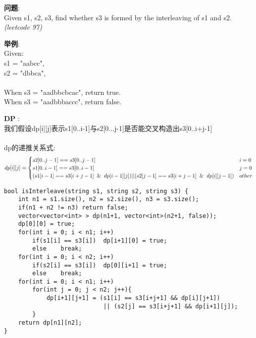     
\begin{description}
    \item{\textbf{问题}}:\\
Given s1, s2, s3, find whether s3 is formed by the interleaving of s1 and s2.\textit{(leetcode 97)}

    \item{\textbf{举例}}:\\
Given:\\
s1 = "aabcc",\\
s2 = "dbbca",\\
\\
When s3 = "aadbbcbcac", return true.\\
When s3 = "aadbbbaccc", return false.\\
    \item{\textbf{DP}} : 
	\\我们假设dp[i][j]表示s1[0..i-1]与s2[0...j-1]是否能交叉构造出s3[0..i+j-1]\\
	\\dp的递推关系式:
$$
dp[i][j] =
\begin{cases} 
s2[0..j-1] == s3[0..j-1] & i = 0 \\
s1[0..i-1] == s3[0..i-1] & j = 0 \\
(s1[i-1] == s3[i+j-1] \And dp[i-1][j]) || (s2[j-1] == s3[i+j-1] \And dp[i][j-1]) & other
\end{cases}
$$
    \begin{lstlisting}
bool isInterleave(string s1, string s2, string s3) {
	int n1 = s1.size(), n2 = s2.size(), n3 = s3.size();
	if(n1 + n2 != n3) return false;
	vector<vector<int> > dp(n1+1, vector<int>(n2+1, false));
	dp[0][0] = true;
	for(int i = 0; i < n1; i++)
		if(s1[i] == s3[i])	dp[i+1][0] = true;
		else	break;
	for(int i = 0; i < n2; i++)
		if(s2[i] == s3[i])	dp[0][i+1] = true;
		else	break;
	for(int i = 0; i < n1; i++)
		for(int j = 0; j < n2; j++){
			dp[i+1][j+1] = (s1[i] == s3[i+j+1] && dp[i][j+1])
							|| (s2[j] == s3[i+j+1] && dp[i+1][j]);
		}
	return dp[n1][n2];
}
    \end{lstlisting}
\end{description}

